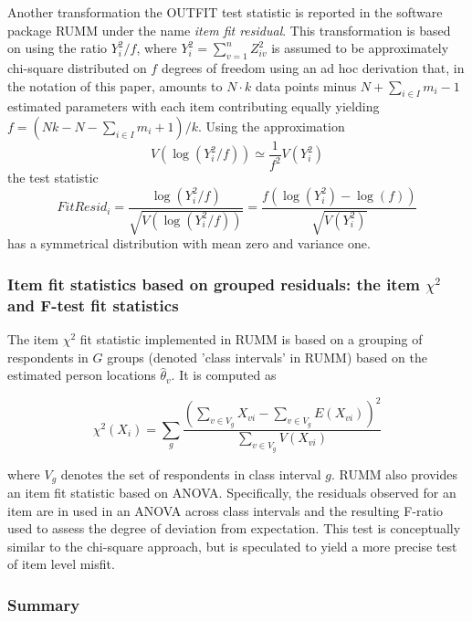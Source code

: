 \documentclass{article}
\begin{document}
Another transformation the OUTFIT test statistic is reported in the software package RUMM \cite{RUMM} under the name \textit{item fit residual}. This transformation is based on using the ratio $Y_{i}^2/f$, where $Y_{i}^2=\sum_{v=1}^nZ_{iv}^2$ is assumed to be approximately chi-square distributed on $f$ degrees of freedom using an ad hoc derivation that, in the notation of this paper, amounts to $N\cdot k$ data points minus $N+\sum_{i\in I}m_i-1$ estimated parameters with each item contributing equally yielding $f=(Nk-N-\sum_{i\in I}m_i+1)/k$. Using the approximation
\begin{equation}
V(\log(Y_i^2/f))\simeq\frac1{f^2}{V(Y_{i}^2)}
\end{equation}
the test statistic
$$
FitResid_i=\frac{\log(Y_i^2/f)}{\sqrt{V(\log(Y_i^2/f))}}
=\frac{f(\log(Y_i^2)-\log(f))}{\sqrt{V(Y_i^2)}}
$$
has a symmetrical distribution with mean zero and variance one.

\subsubsection{Item fit statistics based on grouped residuals: the item $\chi^2$ and  F-test fit statistics}

The item $\chi^2$ fit statistic implemented in RUMM \cite{RUMM} is based on a grouping of respondents in $G$ groups (denoted 'class intervals' in RUMM) based on the estimated person locations $\hat\theta_v$. It is computed as

\begin{equation}
\label{itemchisq}
\chi^2(X_i)=\sum_{g}\frac{\left(\sum_{v\in V_g}X_{vi}-\sum_{v\in V_g}E(X_{vi})\right)^2}{\sum_{v\in V_g}V(X_{vi})}
\end{equation}

where $V_g$ denotes the set of respondents in class interval $g$. RUMM also provides an item fit statistic based on ANOVA. Specifically, the residuals observed for an item are in used in an ANOVA across class intervals and the resulting F-ratio used to assess the degree of deviation from expectation. This test is conceptually similar to the chi-square approach, but is speculated to yield a more precise test of item level misfit.

\subsubsection{Summary}
\end{document}
